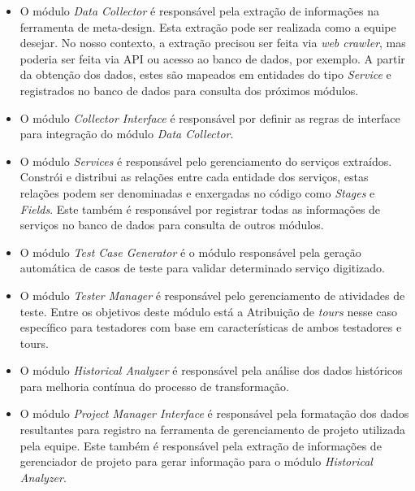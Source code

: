 \begin{itemize}
    \item O módulo \textit{Data Collector} é responsável pela extração de informações na ferramenta de meta-design. Esta extração pode ser realizada como a equipe desejar. No nosso contexto, a extração precisou ser feita via \textit{web crawler}, mas poderia ser feita via API ou acesso ao banco de dados, por exemplo. A partir da obtenção dos dados, estes são mapeados em entidades do tipo \textit{Service} e registrados no banco de dados para consulta dos próximos módulos. 
    
    \item O módulo \textit{Collector Interface} é responsável por definir as regras de interface para integração do módulo \textit{Data Collector}.
    
    \item O módulo \textit{Services} é responsável pelo gerenciamento do serviços extraídos. Constrói e distribui as relações entre cada entidade dos serviços, estas relações podem ser denominadas e enxergadas no código como \textit{Stages} e \textit{Fields}. Este também é responsável por registrar todas as informações de serviços no banco de dados para consulta de outros módulos. 
    
    
    \item O módulo \textit{Test Case Generator} é o módulo responsável pela geração automática de casos de teste para validar determinado serviço digitizado.
    
    \item O módulo \textit{Tester Manager} é responsável pelo gerenciamento de atividades de teste. Entre os objetivos deste módulo está a Atribuição de \textit{tours} nesse caso específico para testadores com base em características de ambos testadores e tours.
    
    \item O módulo \textit{Historical Analyzer} é responsável pela análise dos dados históricos para melhoria contínua do processo de transformação. 
    
    \item O módulo \textit{Project Manager Interface} é responsável pela formatação dos dados resultantes para registro na ferramenta de gerenciamento de projeto utilizada pela equipe. Este também é responsável pela extração de informações de gerenciador de projeto para gerar informação para o módulo \textit{Historical Analyzer}.
\end{itemize}

